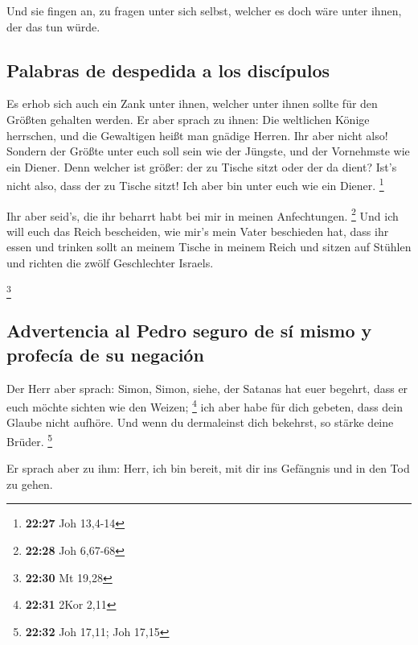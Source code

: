  Und sie fingen an, zu fragen unter sich selbst, welcher
es doch wäre unter ihnen, der das tun würde.

\hypertarget{palabras-de-despedida-a-los-discuxedpulos}{%
\subsection{Palabras de despedida a los
discípulos}\label{palabras-de-despedida-a-los-discuxedpulos}}

 Es erhob sich auch ein Zank unter ihnen, welcher unter
ihnen sollte für den Größten gehalten werden.  Er aber
sprach zu ihnen: Die weltlichen Könige herrschen, und die Gewaltigen
heißt man gnädige Herren.  Ihr aber nicht also! Sondern
der Größte unter euch soll sein wie der Jüngste, und der Vornehmste wie
ein Diener.  Denn welcher ist größer: der zu Tische sitzt
oder der da dient? Ist's nicht also, dass der zu Tische sitzt! Ich aber
bin unter euch wie ein Diener. \footnote{\textbf{22:27} Joh 13,4-14}

 Ihr aber seid's, die ihr beharrt habt bei mir in meinen
Anfechtungen. \footnote{\textbf{22:28} Joh 6,67-68}  Und
ich will euch das Reich bescheiden, wie mir's mein Vater beschieden hat,
 dass ihr essen und trinken sollt an meinem Tische in
meinem Reich und sitzen auf Stühlen und richten die zwölf Geschlechter
Israels.

\footnote{\textbf{22:30} Mt 19,28}

\hypertarget{advertencia-al-pedro-seguro-de-suxed-mismo-y-profecuxeda-de-su-negaciuxf3n}{%
\subsection{Advertencia al Pedro seguro de sí mismo y profecía de su
negación}\label{advertencia-al-pedro-seguro-de-suxed-mismo-y-profecuxeda-de-su-negaciuxf3n}}

 Der Herr aber sprach: Simon, Simon, siehe, der Satanas
hat euer begehrt, dass er euch möchte sichten wie den Weizen;
\footnote{\textbf{22:31} 2Kor 2,11}  ich aber habe für
dich gebeten, dass dein Glaube nicht aufhöre. Und wenn du dermaleinst
dich bekehrst, so stärke deine Brüder. \footnote{\textbf{22:32} Joh
  17,11; Joh 17,15}

 Er sprach aber zu ihm: Herr, ich bin bereit, mit dir ins
Gefängnis und in den Tod zu gehen.

